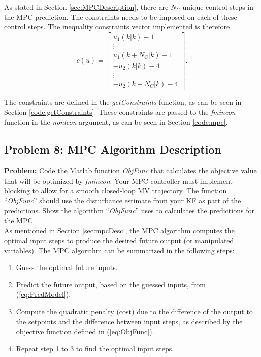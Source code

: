 \documentclass[12pt]{article}
\begin{document}
As stated in Section \ref{sec:MPCDescription}, there are $N_C$ unique control steps in the MPC prediction. The constraints needs to be imposed on each of these control steps. The inequality constraints vector implemented is therefore
\begin{equation}
c(u) = \begin{bmatrix}
u_1(k|k) - 1 \\
\vdots \\
u_1(k+N_C|k) - 1 \\
-u_2(k|k) - 4 \\
\vdots \\
-u_2(k+N_C|k) - 4
\end{bmatrix}.
\end{equation}

The constraints are defined in the \textit{getConstraints} function, as can be seen in Section \ref{code:getConstraints}. These constraints are passed to the \textit{fmincon} function in the \textit{nonlcon} argument, as can be seen in Section \ref{code:mpc}.

\subsection{Problem 8: MPC Algorithm Description}

\textbf{Problem:} Code the Matlab function \textit{ObjFunc} that calculates the objective value that will be optimized by \textit{fmincon}. Your MPC controller must implement blocking to allow for a smooth closed-loop MV trajectory. The function “\textit{ObjFunc}” should use the disturbance estimate from your KF as part of the predictions. Show the algorithm “\textit{ObjFunc}” uses to calculates the predictions for the MPC. \\

As mentioned in Section \ref{sec:mpcDesc}, the MPC algorithm computes the optimal input steps to produce the desired future output (or manipulated variables). The MPC algorithm can be summarized in the following steps:
\begin{enumerate}
	\item Guess the optimal future inputs.
	\item Predict the future output, based on the guessed inputs, from (\ref{eq:PredModel}). 
	\item Compute the quadratic penalty (cost) due to the difference of the output to the setpoints and the difference between input steps, as described by the objective function defined in (\ref{eq:ObjFunc}).
	\item Repeat step 1 to 3 to find the optimal input steps.
\end{enumerate}
\end{document}
